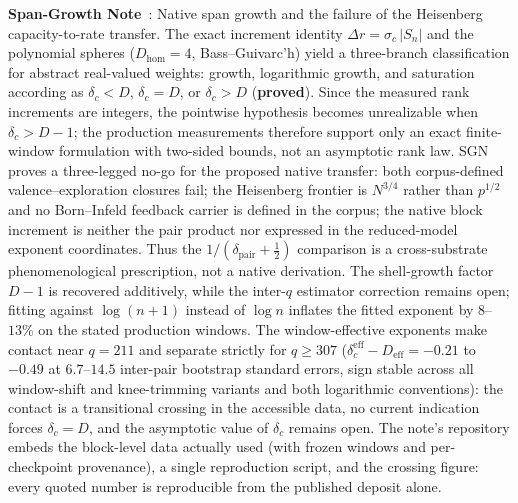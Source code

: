 \documentclass[11pt,a4paper]{article}
\newcommand{\sproved}{\textcolor{cproved}{\textbf{proved}}}
\begin{document}
    \textbf{Span-Growth Note}~\cite{Beau2026sgn}: Native span growth and the failure of the
    Heisenberg capacity-to-rate transfer.
    The exact increment identity $\Delta r = \sigma_c\,|S_n|$ and the polynomial spheres
    ($D_{\mathrm{hom}} = 4$, Bass--Guivarc'h) yield a three-branch classification for abstract
    real-valued weights: growth, logarithmic growth, and saturation according as
    $\delta_c<D$, $\delta_c=D$, or $\delta_c>D$ (\sproved).
    Since the measured rank increments are integers, the pointwise hypothesis becomes unrealizable
    when $\delta_c>D-1$; the production measurements therefore support only an exact finite-window
    formulation with two-sided bounds, not an asymptotic rank law.
    SGN proves a three-legged no-go for the proposed native transfer: both corpus-defined
    valence--exploration closures fail; the Heisenberg frontier is $N^{3/4}$ rather than
    $p^{1/2}$ and no Born--Infeld feedback carrier is defined in the corpus;
    the native block increment is
    neither the pair product nor expressed in the reduced-model exponent coordinates.
    Thus the $1/(\delta_{\mathrm{pair}}+\tfrac12)$ comparison is a cross-substrate phenomenological
    prescription, not a native derivation.
    The shell-growth factor $D-1$ is recovered additively, while the inter-$q$ estimator correction
    remains open; fitting against $\log(n+1)$ instead of $\log n$ inflates the fitted exponent by
    $8$--$13\%$ on the stated production windows.
    The window-effective exponents make contact near $q = 211$ and separate strictly for
    $q \ge 307$ ($\delta_c^{\mathrm{eff}} - D_{\mathrm{eff}} = -0.21$ to $-0.49$ at $6.7$--$14.5$
    inter-pair bootstrap standard errors, sign stable across all window-shift and knee-trimming
    variants and both logarithmic conventions): the contact is a transitional crossing in the
    accessible data, no current indication forces $\delta_c = D$, and the asymptotic value of
    $\delta_c$ remains open.
    The note's repository embeds the block-level data actually used (with frozen windows and
    per-checkpoint provenance), a single reproduction script, and the crossing figure: every quoted
    number is reproducible from the published deposit alone.
\end{document}
